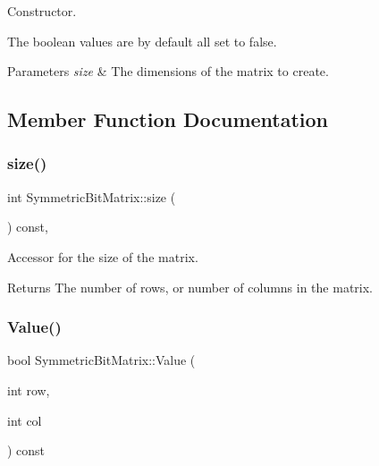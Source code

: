 Constructor. 

The boolean values are by default all set to {\ttfamily false}. 
\begin{DoxyParams}{Parameters}
{\em size} & The dimensions of the matrix to create. \\
\hline
\end{DoxyParams}


\subsection{Member Function Documentation}
\mbox{\label{class_symmetric_bit_matrix_aed948744d70716f6325063ed55a76c6c}} 
\subsubsection{\texorpdfstring{size()}{size()}}
{\footnotesize\ttfamily int Symmetric\+Bit\+Matrix\+::size (\begin{DoxyParamCaption}{ }\end{DoxyParamCaption}) const\hspace{0.3cm}{\ttfamily [inline]}, {\ttfamily [noexcept]}}



Accessor for the size of the matrix. 

\begin{DoxyReturn}{Returns}
The number of rows, or number of columns in the matrix. 
\end{DoxyReturn}
\mbox{\label{class_symmetric_bit_matrix_a02221e8620c41734a56ec329da1b66c6}} 
\subsubsection{\texorpdfstring{Value()}{Value()}}
{\footnotesize\ttfamily bool Symmetric\+Bit\+Matrix\+::\+Value (\begin{DoxyParamCaption}\item[{int}]{row,  }\item[{int}]{col }\end{DoxyParamCaption}) const\hspace{0.3cm}{\ttfamily [inline]}}



